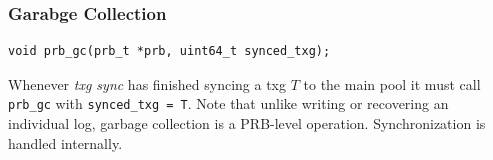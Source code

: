 \documentclass[12pt,a4paper,twoside]{book}
\begin{document}
\subsubsection{Garabge Collection}

\begin{lstlisting}
void prb_gc(prb_t *prb, uint64_t synced_txg);
\end{lstlisting}

Whenever \textit{txg sync} has finished syncing a txg $T$ to the main pool it must call \lstinline{prb_gc} with \lstinline{synced_txg = T}.
Note that unlike writing or recovering an individual log, garbage collection is a PRB-level operation.
Synchronization is handled internally.


\end{document}
